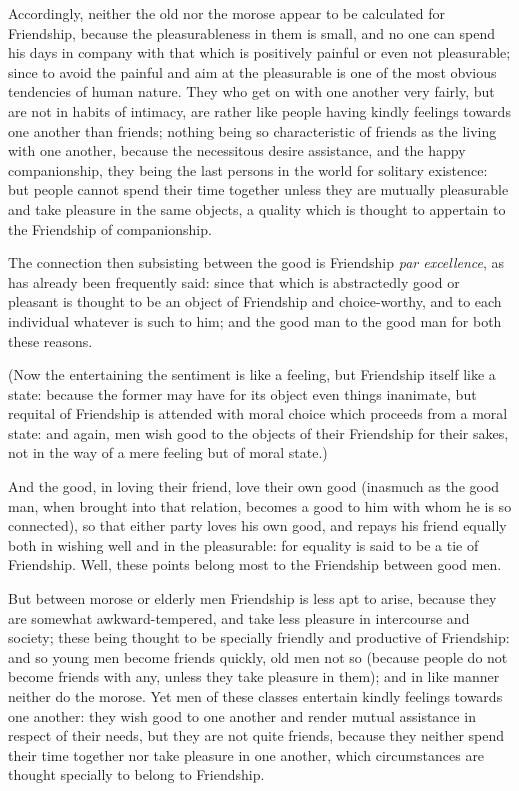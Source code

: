 Accordingly, neither the old nor the morose appear to be calculated for
Friendship, because the pleasurableness in them is small, and no one can spend
his days in company with that which is positively painful or even not
pleasurable; since to avoid the painful and aim at the pleasurable is one of
the most obvious tendencies of human nature. They who get on with one another
very fairly, but are not in habits of intimacy, are rather like people having
kindly feelings towards one another than friends; nothing being so
characteristic of friends as the living with one another, because the
necessitous desire assistance, and the happy companionship, they being the last
persons in the world for solitary existence: but people cannot spend their time
together unless they are mutually pleasurable and take pleasure in the same
objects, a quality which is thought to appertain to the Friendship of
companionship.


The connection then subsisting between the good is Friendship \emph{par
excellence}, as has already been frequently said: since that which is
abstractedly good or pleasant is thought to be an object of Friendship and
choice-worthy, and to each individual whatever is such to him; and the good man
to the good man for both these reasons.

(Now the entertaining the sentiment is like a feeling, but Friendship itself
like a state: because the former may have for its object even things inanimate,
but requital of Friendship is attended with moral choice which proceeds from a
moral state: and again, men wish good to the objects of their Friendship for
their sakes, not in the way of a mere feeling but of moral state.)

And the good, in loving their friend, love their own good (inasmuch as the good
man, when brought into that relation, becomes a good to him with whom he is so
connected), so that either party loves his own good, and repays his friend
equally both in wishing well and in the pleasurable: for equality is said to be
a tie of Friendship. Well, these points belong most to the Friendship between
good men.

But between morose or elderly men Friendship is less apt to arise, because they
are somewhat awkward-tempered, and take less pleasure in intercourse and
society; these being thought to be specially friendly and productive of
Friendship: and so young men become friends quickly, old men not so (because
people do not become friends with any, unless they take pleasure in them); and
in like manner neither do the morose. Yet men of these classes entertain kindly
feelings towards one another: they wish good to one another and render mutual
assistance in respect of their needs, but they are not quite friends, because
they neither spend their time together nor take pleasure in one another, which
circumstances are thought specially to belong to Friendship.

